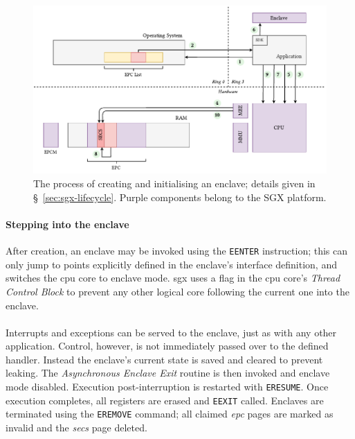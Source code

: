 \begin{figure}[]
    \centering
    \includegraphics[width=\linewidth]{figures/SGX-EnclaveCreate.pdf}
    \captionsetup{justification=centering}
    \caption[The process of creating and initialising an enclave.]{The process of creating and initialising an enclave; details given in §~\ref{sec:sgx-lifecycle}. Purple components belong to the SGX platform.}
    \label{fig:sgx-enclavecreate}
\end{figure}

\paragraph{Stepping into the enclave} After creation, an enclave may be invoked using the \texttt{EENTER} instruction; this can only jump to points explicitly defined in the enclave's interface definition, and switches the \acrshort{cpu} core to enclave mode. \acrshort{sgx} uses a flag in the \acrshort{cpu} core's \textit{Thread Control Block} to prevent any other logical core following the current one into the enclave.

\paragraph{} Interrupts and exceptions can be served to the enclave, just as with any other application. Control, however, is not immediately passed over to the defined handler. Instead the enclave's current state is saved and cleared to prevent leaking. The \textit{Asynchronous Enclave Exit} routine is then invoked and enclave mode disabled. Execution post-interruption is restarted with \texttt{ERESUME}. Once execution completes, all registers are erased and \texttt{EEXIT} called. Enclaves are terminated using the \texttt{EREMOVE} command; all claimed \textit{\acrshort{epc}} pages are marked as invalid and the \textit{\acrshort{secs}} page deleted.

